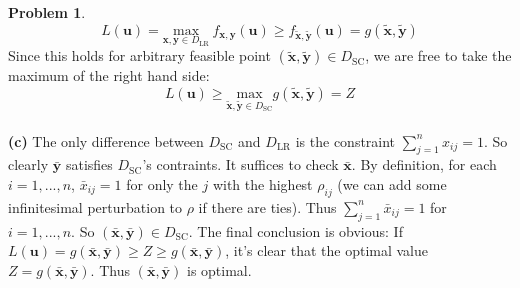 \documentclass[a4paper, 8pt]{article}
\theoremstyle{definition}
\newtheorem{problem}{Problem}
\theoremstyle{hSol}
\begin{document}
\begin{problem}
\begin{equation}
	L(\bm{u}) = \underset{\bm{x,y} \in D_{\text{LR}}}{\text{max}} ~f_{\bm{x,y}}(\bm{u})\geq f_{\widetilde{\bm{x}}, \widetilde{\bm{y}}}(\bm{u}) = g(\widetilde{\bm{x}}, \widetilde{\bm{y}})
\end{equation}
Since this holds for arbitrary feasible point $(\widetilde{\bm{x}}, \widetilde{\bm{y}}) \in D_{\text{SC}}$, we are free to take the maximum of the right hand side:
\begin{equation}
	L(\bm{u}) \geq \underset{\widetilde{\bm{x}}, \widetilde{\bm{y}} \in D_{\text{SC}}}{\text{max}} g(\widetilde{\bm{x}}, \widetilde{\bm{y}}) = Z
\end{equation}
~\\
\textbf{(c)} The only difference between $D_{\text{SC}}$ and $D_{\text{LR}}$ is the constraint $\sum_{j=1}^n x_{ij}=1$. So clearly $\bar{\bm{y}}$ satisfies $D_{\text{SC}}$'s contraints. It suffices to check $\bar{\bm{x}}$. By definition, for each $i=1,...,n$, $\bar{x}_{ij}=1$ for only the $j$ with the highest $\rho_{ij}$ (we can add some infinitesimal perturbation to $\rho$ if there are ties). Thus $\sum_{j=1}^n \bar{x}_{ij}=1$ for $i=1,...,n$. So $(\bar{\bm{x}},\bar{\bm{y}})\in D_{\text{SC}}$. The final conclusion is obvious: If $L(\bm{u}) = g(\bar{\bm{x}},\bar{\bm{y}}) \geq Z \geq g(\bar{\bm{x}},\bar{\bm{y}})$, it's clear that the optimal value $Z=g(\bar{\bm{x}},\bar{\bm{y}})$. Thus $(\bar{\bm{x}},\bar{\bm{y}})$ is optimal.
\end{problem}
\end{document}
